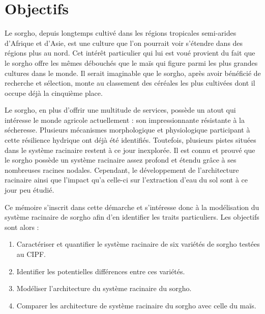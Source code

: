 \section{Objectifs}

Le sorgho, depuis longtemps cultivé dans les régions tropicales semi-arides d'Afrique et d'Asie, est une culture que l'on pourrait voir s'étendre dans des régions plus au nord.
Cet intérêt particulier qui lui est voué provient du fait que le sorgho offre les mêmes débouchés que le maïs qui figure parmi les plus grandes cultures dans le monde.
Il serait imaginable que le sorgho, après avoir bénéficié de recherche et sélection, monte au classement des céréales les plus cultivées dont il occupe déjà la cinquième place.
\newline

Le sorgho, en plus d'offrir une multitude de services, possède un atout qui intéresse le monde agricole actuellement : son impressionnante résistante à la sécheresse.
Plusieurs mécanismes morphologique et physiologique participant à cette résilience hydrique ont déjà été identifiés.
Toutefois, plusieurs pistes situées dans le système racinaire restent à ce jour inexplorée.
Il est connu et prouvé que le sorgho possède un système racinaire assez profond et étendu grâce à ses nombreuses racines nodales.
Cependant, le développement de l'architecture racinaire ainsi que l'impact qu'a celle-ci sur l'extraction d'eau du sol sont à ce jour peu étudié.
\newline

Ce mémoire s'inscrit dans cette démarche et s'intéresse donc à la modélisation du système racinaire de sorgho afin d'en identifier les traits particuliers.
Les objectifs sont alors :
\begin{enumerate}
    \item Caractériser et quantifier le système racinaire de six variétés de sorgho testées au CIPF. 
    \item Identifier les potentielles différences entre ces variétés.
    \item Modéliser l'architecture du système racinaire du sorgho.
    \item Comparer les architecture de système racinaire du sorgho avec celle du maïs.
\end{enumerate}

